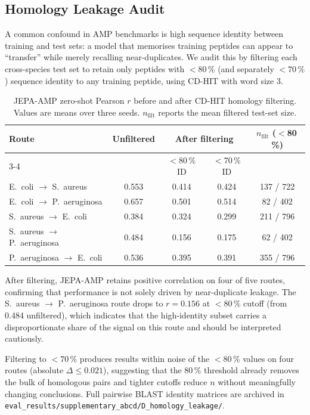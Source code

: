 \subsection{Homology Leakage Audit}
\label{sec:res_homology}

A common confound in AMP benchmarks is high sequence identity between training
and test sets: a model that memorises training peptides can appear to
``transfer'' while merely recalling near-duplicates.
We audit this by filtering each cross-species test set to retain only
peptides with $<80\,\%$ (and separately $<70\,\%$) sequence identity to any
training peptide, using CD-HIT with word size 3.

\begin{table}[h]
\centering
\caption{JEPA-AMP zero-shot Pearson $r$ before and after CD-HIT homology
  filtering.
  Values are means over three seeds.
  $n_{\text{filt}}$ reports the mean filtered test-set size.}
\label{tab:homology}
\begin{tabular}{lcccc}
\toprule
\textbf{Route}
  & \textbf{Unfiltered}
  & \multicolumn{2}{c}{\textbf{After filtering}}
  & $n_{\text{filt}}$ ($<$80\,\%) \\
\cmidrule(lr){3-4}
  & & $<$80\,\% ID & $<$70\,\% ID & \\
\midrule
E.~coli $\to$ S.~aureus       & 0.553 & 0.414 & 0.424 & 137 / 722 \\
E.~coli $\to$ P.~aeruginosa   & 0.657 & 0.501 & 0.514 & 82 / 402  \\
S.~aureus $\to$ E.~coli       & 0.384 & 0.324 & 0.299 & 211 / 796 \\
S.~aureus $\to$ P.~aeruginosa & 0.484 & 0.156 & 0.175 & 62 / 402  \\
P.~aeruginosa $\to$ E.~coli   & 0.536 & 0.395 & 0.391 & 355 / 796 \\
\bottomrule
\end{tabular}
\end{table}

After filtering, JEPA-AMP retains positive correlation on four of five routes,
confirming that performance is not solely driven by near-duplicate leakage.
The S.~aureus $\to$ P.~aeruginosa route drops to $r = 0.156$ at $<80\,\%$
cutoff (from 0.484 unfiltered), which indicates that the high-identity subset
carries a disproportionate share of the signal on this route and should be
interpreted cautiously.

Filtering to $<70\,\%$ produces results within noise of the $<80\,\%$ values
on four routes (absolute $\Delta \leq 0.021$), suggesting that the
$80\,\%$ threshold already removes the bulk of homologous pairs and tighter
cutoffs reduce $n$ without meaningfully changing conclusions.
Full pairwise BLAST identity matrices are archived in
\texttt{eval\_results/supplementary\_abcd/D\_homology\_leakage/}.

